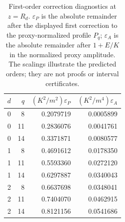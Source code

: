 \begin{table}[htbp]
\centering
\caption{First-order correction diagnostics at $z=R_d$.
$\varepsilon_P$ is the absolute remainder after the displayed first correction
to the proxy-normalized profile $P_q$; $\varepsilon_A$ is the absolute
remainder after $1+E/K$ in the normalized proxy amplitude.
The scalings illustrate the predicted orders; they are not proofs or interval certificates.}
\label{tab:computed-first-corrections}
\begin{tabular}{rrrr}
\toprule
$d$ & $q$ & $(K^2/m^2)\varepsilon_P$ & $(K^2/m^4)\varepsilon_A$ \\
\midrule
0 & 8 & 0.2079719 & 0.0005899 \\
0 & 11 & 0.2836076 & 0.0041761 \\
0 & 14 & 0.3371871 & 0.0080577 \\
1 & 8 & 0.4691612 & 0.0178350 \\
1 & 11 & 0.5593360 & 0.0272120 \\
1 & 14 & 0.6297887 & 0.0340043 \\
2 & 8 & 0.6637698 & 0.0348041 \\
2 & 11 & 0.7404070 & 0.0462915 \\
2 & 14 & 0.8121156 & 0.0541686 \\
\bottomrule
\end{tabular}
\end{table}
